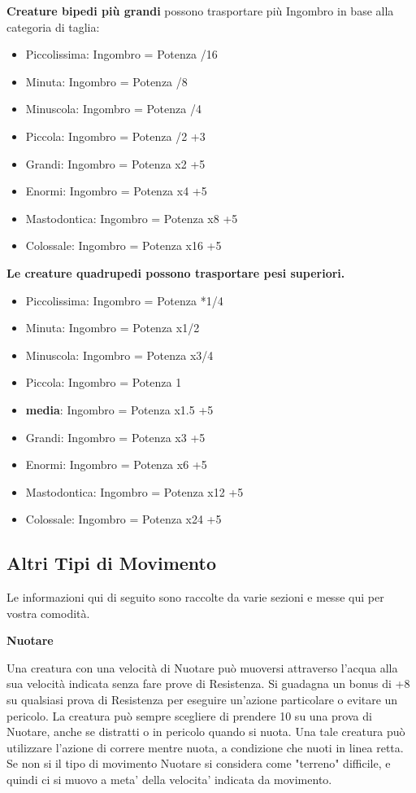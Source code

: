 \documentclass[a4paper,11pt,twoside,openany]{book}
\begin{document}
\textbf{Creature bipedi più grandi} possono trasportare più Ingombro in base alla categoria di taglia:

\begin{itemize}
	\item Piccolissima: Ingombro = Potenza /16
	\item Minuta: Ingombro = Potenza /8
	\item Minuscola: Ingombro = Potenza /4
	\item Piccola: Ingombro = Potenza /2 +3
	\item Grandi: Ingombro = Potenza x2 +5
	\item Enormi: Ingombro = Potenza x4 +5
	\item Mastodontica: Ingombro = Potenza x8 +5
	\item Colossale: Ingombro = Potenza x16 +5
\end{itemize}

\bigskip


\textbf{Le creature quadrupedi possono trasportare pesi superiori. }


\begin{itemize}
	\item Piccolissima: Ingombro = Potenza *1/4
	\item Minuta: Ingombro = Potenza x1/2
	\item Minuscola: Ingombro = Potenza x3/4
	\item Piccola: Ingombro = Potenza 1
	\item \textbf{media}: Ingombro = Potenza x1.5 +5
	\item Grandi: Ingombro = Potenza x3 +5
	\item Enormi: Ingombro = Potenza x6 +5
	\item Mastodontica: Ingombro = Potenza x12 +5
	\item Colossale: Ingombro = Potenza x24 +5
\end{itemize}

\subsection{Altri Tipi di Movimento}

\label{altri-tipi-di-movimento}

Le informazioni qui di seguito sono raccolte da varie sezioni e messe qui per vostra comodità.

\textbf{Nuotare}

Una creatura con una velocità di Nuotare può muoversi attraverso l'acqua alla sua velocità indicata senza fare prove di Resistenza. Si guadagna un bonus di +8 su qualsiasi prova di Resistenza per eseguire un'azione particolare o evitare un pericolo. La creatura può sempre scegliere di prendere 10 su una prova di Nuotare, anche se distratti o in pericolo quando si nuota. Una tale creatura può utilizzare l'azione di correre mentre nuota, a condizione che nuoti in linea retta.\\
Se non si il tipo di movimento Nuotare si considera come "terreno" difficile, e quindi ci si muovo a meta' della velocita' indicata da movimento.
\end{document}
